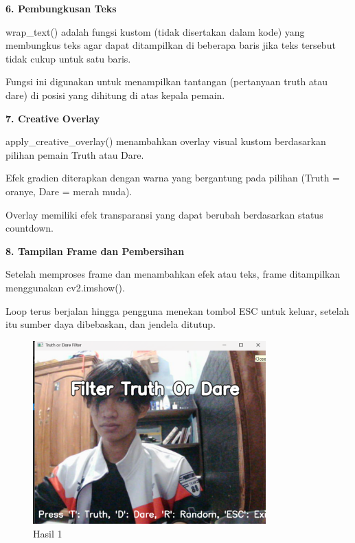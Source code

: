 \documentclass[11pt,a4paper]{article}
\begin{document}
\textbf{6. Pembungkusan Teks }

wrap\_text() adalah fungsi kustom (tidak disertakan dalam kode) yang membungkus teks agar dapat ditampilkan di beberapa baris jika teks tersebut tidak cukup untuk satu baris.  

Fungsi ini digunakan untuk menampilkan tantangan (pertanyaan truth atau dare) di posisi yang dihitung di atas kepala pemain.

\textbf{7. Creative Overlay  }

apply\_creative\_overlay() menambahkan overlay visual kustom berdasarkan pilihan pemain Truth atau Dare.  

Efek gradien diterapkan dengan warna yang bergantung pada pilihan (Truth = oranye, Dare = merah muda).  

Overlay memiliki efek transparansi yang dapat berubah berdasarkan status countdown.

\textbf{8. Tampilan Frame dan Pembersihan } 

Setelah memproses frame dan menambahkan efek atau teks, frame ditampilkan menggunakan cv2.imshow().  

Loop terus berjalan hingga pengguna menekan tombol ESC untuk keluar, setelah itu sumber daya dibebaskan, dan jendela ditutup.


\begin{figure}[H]
    \centering
    \includegraphics[width=0.8\textwidth]{11.png} %
    \caption{Hasil 1}
    \label{fig:11}
\end{figure}
\end{document}
